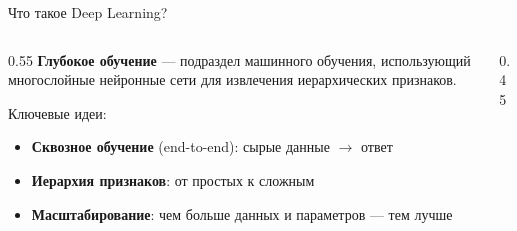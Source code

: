 \documentclass[aspectratio=169, 9pt]{beamer}
\begin{document}
\begin{frame}{Что такое Deep Learning?}
  \begin{columns}[T]
    \begin{column}{0.55\textwidth}
      \textbf{Глубокое обучение} — подраздел машинного обучения, использующий многослойные нейронные сети для извлечения иерархических признаков.
      
      \vspace{0.3em}
      Ключевые идеи:
      \begin{itemize}
        \item \textbf{Сквозное обучение} (end-to-end): сырые данные $\to$ ответ
        \item \textbf{Иерархия признаков}: от простых к сложным
        \item \textbf{Масштабирование}: чем больше данных и параметров — тем лучше
      \end{itemize}
    \end{column}
    \begin{column}{0.45\textwidth}
      \begin{center}
\end{center}
\end{column}
\end{columns}
\end{frame}
\end{document}
